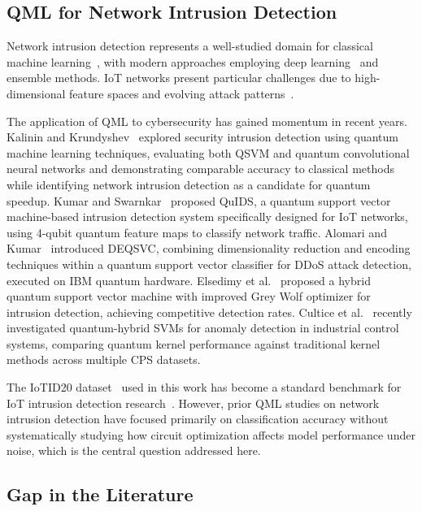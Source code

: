 \documentclass{ieeeaccess}
\begin{document}
\subsection{QML for Network Intrusion Detection}
\label{sec:rw_nids}

Network intrusion detection represents a well-studied domain for classical machine learning~\cite{Buczak2016,Aldweesh2020}, with modern approaches employing deep learning~\cite{Vinayakumar2019} and ensemble methods. IoT networks present particular challenges due to high-dimensional feature spaces and evolving attack patterns~\cite{Cook2019}.

The application of QML to cybersecurity has gained momentum in recent years. Kalinin and Krundyshev~\cite{Kalinin2023} explored security intrusion detection using quantum machine learning techniques, evaluating both QSVM and quantum convolutional neural networks and demonstrating comparable accuracy to classical methods while identifying network intrusion detection as a candidate for quantum speedup. Kumar and Swarnkar~\cite{Kumar2025} proposed QuIDS, a quantum support vector machine-based intrusion detection system specifically designed for IoT networks, using 4-qubit quantum feature maps to classify network traffic. Alomari and Kumar~\cite{Alomari2023} introduced DEQSVC, combining dimensionality reduction and encoding techniques within a quantum support vector classifier for DDoS attack detection, executed on IBM quantum hardware. Elsedimy et al.~\cite{Elsedimy2024} proposed a hybrid quantum support vector machine with improved Grey Wolf optimizer for intrusion detection, achieving competitive detection rates. Cultice et al.~\cite{Cultice2025} recently investigated quantum-hybrid SVMs for anomaly detection in industrial control systems, comparing quantum kernel performance against traditional kernel methods across multiple CPS datasets.

The IoTID20 dataset~\cite{ullah2020scheme} used in this work has become a standard benchmark for IoT intrusion detection research~\cite{Houkan2024,Adefemi2025}. However, prior QML studies on network intrusion detection have focused primarily on classification accuracy without systematically studying how circuit optimization affects model performance under noise, which is the central question addressed here.

\subsection{Gap in the Literature}
\label{sec:rw_gap}
\end{document}

